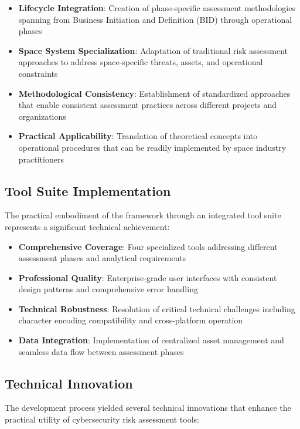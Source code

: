 \documentclass[binding=0.6cm]{sapthesis}
\begin{document}
\begin{itemize}
    \item \textbf{Lifecycle Integration}: Creation of phase-specific assessment methodologies spanning from Business Initiation and Definition (BID) through operational phases
    \item \textbf{Space System Specialization}: Adaptation of traditional risk assessment approaches to address space-specific threats, assets, and operational constraints
    \item \textbf{Methodological Consistency}: Establishment of standardized approaches that enable consistent assessment practices across different projects and organizations
    \item \textbf{Practical Applicability}: Translation of theoretical concepts into operational procedures that can be readily implemented by space industry practitioners
\end{itemize}

\subsection{Tool Suite Implementation}

The practical embodiment of the framework through an integrated tool suite represents a significant technical achievement:

\begin{itemize}
    \item \textbf{Comprehensive Coverage}: Four specialized tools addressing different assessment phases and analytical requirements
    \item \textbf{Professional Quality}: Enterprise-grade user interfaces with consistent design patterns and comprehensive error handling
    \item \textbf{Technical Robustness}: Resolution of critical technical challenges including character encoding compatibility and cross-platform operation
    \item \textbf{Data Integration}: Implementation of centralized asset management and seamless data flow between assessment phases
\end{itemize}

\subsection{Technical Innovation}

The development process yielded several technical innovations that enhance the practical utility of cybersecurity risk assessment tools:
\end{document}
